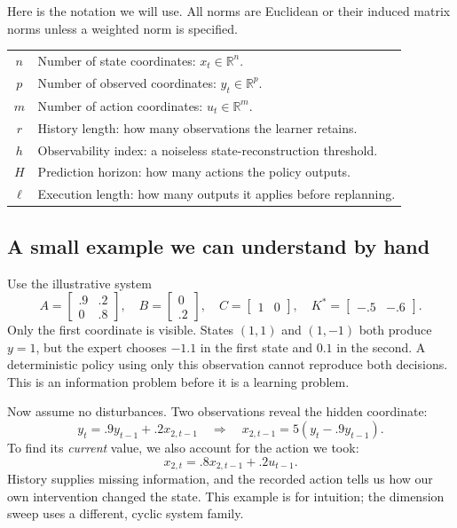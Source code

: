 \documentclass[12 pt]{article}        	%
\newcommand{\R}[0]{\mathbb{R}}
\theoremstyle{definition}
\begin{document}
Here is the notation we will use. All norms are Euclidean or their induced matrix norms unless a weighted norm is specified.
\begin{center}
\begin{tabular}{cl}
$n$ & Number of state coordinates: $x_t\in\R^n$.\\
$p$ & Number of observed coordinates: $y_t\in\R^p$.\\
$m$ & Number of action coordinates: $u_t\in\R^m$.\\
$r$ & History length: how many observations the learner retains.\\
$h$ & Observability index: a noiseless state-reconstruction threshold.\\
$H$ & Prediction horizon: how many actions the policy outputs.\\
$\ell$ & Execution length: how many outputs it applies before replanning.
\end{tabular}
\end{center}

\subsection{A small example we can understand by hand}
Use the illustrative system
\[
A=\begin{bmatrix}.9&.2\\0&.8\end{bmatrix},\quad
B=\begin{bmatrix}0\\.2\end{bmatrix},\quad
C=\begin{bmatrix}1&0\end{bmatrix},\quad
K^*=\begin{bmatrix}-.5&-.6\end{bmatrix}.
\]
Only the first coordinate is visible. States $(1,1)$ and $(1,-1)$ both produce $y=1$, but the expert chooses $-1.1$ in the first state and $0.1$ in the second. A deterministic policy using only this observation cannot reproduce both decisions. This is an information problem before it is a learning problem.

Now assume no disturbances. Two observations reveal the hidden coordinate:
\[
y_t=.9y_{t-1}+.2x_{2,t-1}
\quad\Longrightarrow\quad
x_{2,t-1}=5(y_t-.9y_{t-1}).
\]
To find its \emph{current} value, we also account for the action we took:
\[
x_{2,t}=.8x_{2,t-1}+.2u_{t-1}.
\]
History supplies missing information, and the recorded action tells us how our own intervention changed the state. This example is for intuition; the dimension sweep uses a different, cyclic system family.
\end{document}
